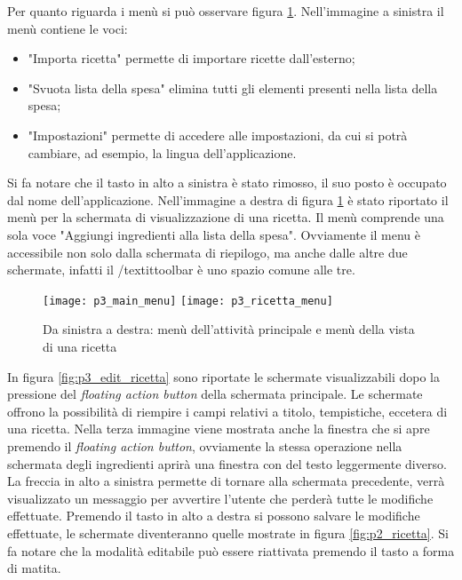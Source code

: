 Per quanto riguarda i menù si può osservare figura \ref{fig:p3_menu}.
Nell'immagine a sinistra il menù contiene le voci:
\begin{itemize}
  \item "Importa ricetta" permette di importare ricette dall'esterno;
  \item "Svuota lista della spesa" elimina tutti gli elementi presenti nella lista della spesa;
  \item "Impostazioni" permette di accedere alle impostazioni, da cui si potrà cambiare, ad esempio, la lingua dell'applicazione.
\end{itemize}
Si fa notare che il tasto in alto a sinistra è stato rimosso, il suo posto è occupato dal nome dell'applicazione.
Nell'immagine a destra di figura \ref{fig:p3_menu} è stato riportato il menù per la schermata di visualizzazione di una ricetta.
Il menù comprende una sola voce "Aggiungi ingredienti alla lista della spesa".
Ovviamente il menu è accessibile non solo dalla schermata di riepilogo, ma anche dalle altre due schermate, infatti il /textit{toolbar} è uno spazio comune alle tre.
\begin{figure}[ht]
  \begin{center}
    \texttt{[image: p3\_main\_menu]}
    \texttt{[image: p3\_ricetta\_menu]}
    \caption{Da sinistra a destra: menù dell'attività principale e menù della vista di una ricetta}
    \label{fig:p3_menu}
  \end{center}
\end{figure}
\clearpage

In figura \ref{fig:p3_edit_ricetta} sono riportate le schermate visualizzabili dopo la pressione del \textit{floating action button} della schermata principale.
Le schermate offrono la possibilità di riempire i campi relativi a titolo, tempistiche, eccetera di una ricetta.
Nella terza immagine viene mostrata anche la finestra che si apre premendo il \textit{floating action button}, ovviamente la stessa operazione nella schermata degli ingredienti aprirà una finestra con del testo leggermente diverso.
La freccia in alto a sinistra permette di tornare alla schermata precedente, verrà visualizzato un messaggio per avvertire l'utente che perderà tutte le modifiche effettuate.
Premendo il tasto in alto a destra si possono salvare le modifiche effettuate, le schermate diventeranno quelle mostrate in figura \ref{fig:p2_ricetta}.
Si fa notare che la modalità editabile può essere riattivata premendo il tasto a forma di matita.


